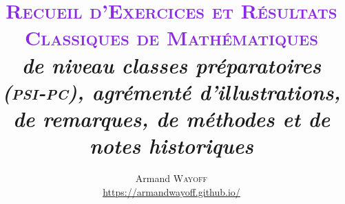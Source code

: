 \documentclass[
	a4paper, %
	fontsize=11pt, %
	twoside=true, %
	chapterentrydots=true, %
	numbers=noenddot, %
]{kaobook}
\begin{document}


\title[Recueil des Exercices et Résultats Classiques de Mathématiques]{
\fontsize{26pt}{28pt}\selectfont
\textcolor{BlueViolet}{\textrm{\textsc{
Recueil d'Exercices et Résultats Classiques de Mathématiques
}}}
\\ \vspace{0.6cm}
\fontsize{16pt}{18pt}\selectfont
\textrm{\textsl{
de niveau classes préparatoires (\textsc{psi}-\textsc{pc}), agrémenté d’illustrations, de remarques, de méthodes et de notes historiques
}}
\\}

\author[Armand Wayoff]{Armand \textsc{Wayoff} \\ \url{https://armandwayoff.github.io/}}

\date{}



\frontmatter %



\maketitle

\end{document}
